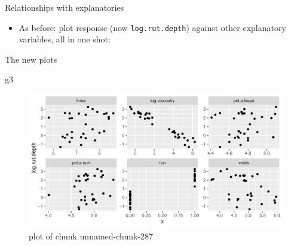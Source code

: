 \documentclass[
  ignorenonframetext,
]{beamer}
\newenvironment{Shaded}{\begin{snugshade}}{\end{snugshade}}
\newcommand{\DataTypeTok}[1]{\textcolor[rgb]{0.13,0.29,0.53}{#1}}
\newcommand{\DecValTok}[1]{\textcolor[rgb]{0.00,0.00,0.81}{#1}}
\newcommand{\KeywordTok}[1]{\textcolor[rgb]{0.13,0.29,0.53}{\textbf{#1}}}
\newcommand{\NormalTok}[1]{#1}
\newcommand{\OperatorTok}[1]{\textcolor[rgb]{0.81,0.36,0.00}{\textbf{#1}}}
\newcommand{\StringTok}[1]{\textcolor[rgb]{0.31,0.60,0.02}{#1}}
\providecommand{\tightlist}{%
  \setlength{\itemsep}{0pt}\setlength{\parskip}{0pt}}
\begin{document}
\begin{frame}[fragile]{Relationships with explanatories}
\protect\hypertarget{relationships-with-explanatories}{}

\begin{itemize}
\tightlist
\item
  As before: plot response (now \texttt{log.rut.depth}) against other
  explanatory variables, all in one shot:
\end{itemize}

\begin{Shaded}
\end{Shaded}

\end{frame}

\begin{frame}[fragile]{The new plots}
\protect\hypertarget{the-new-plots}{}

\begin{Shaded}
\begin{Highlighting}[]
\NormalTok{g3}
\end{Highlighting}
\end{Shaded}

\begin{figure}
\centering
\includegraphics{figure/unnamed-chunk-287-1.pdf}
\caption{plot of chunk unnamed-chunk-287}
\end{figure}

\end{frame}
\end{document}
